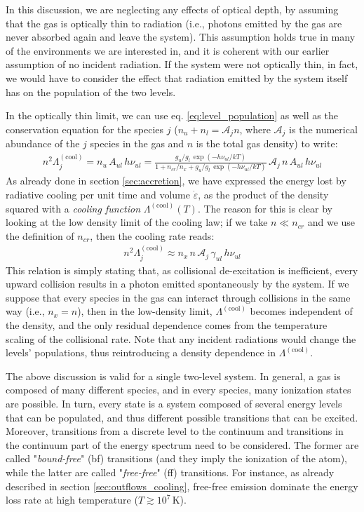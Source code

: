 In this discussion, we are neglecting any effects of optical depth, by assuming that the gas is optically thin to radiation (i.e., photons emitted by the gas are never absorbed again and leave the system). This assumption holds true in many of the environments we are interested in, and it is coherent with our earlier assumption of no incident radiation. If the system were not optically thin, in fact, we would have to consider the effect that radiation emitted by the system itself has on the population of the two levels. 

In the optically thin limit, we can use eq. \ref{eq:level_population} as well as the conservation equation for the species $j$ ($n_u + n_l = \mathcal{A}_j n$, where $\mathcal{A}_j$ is the numerical abundance of the $j$ species in the gas and $n$ is the total gas density) to write:
\begin{align}
    n^2 \Lambda_j^{\mathrm{(cool)}} = n_u\,A_{ul}\,h\nu_{ul} = \frac{g_u/g_l\, \exp(-h\nu_{ul}/kT)}{1+n_{cr}/n_x+ g_u/g_l\, \exp(-h\nu_{ul}/kT)}\,\mathcal{A}_j\,n\,A_{ul}\,h\nu_{ul}
\end{align}
As already done in section \ref{sec:accretion}, we have expressed the energy lost by radiative cooling per unit time and volume $\dot{\varepsilon}$, as the product of the density squared with a \textit{cooling function} $\Lambda^{\mathrm{(cool)}}(T)$. The reason for this is clear by looking at the low density limit of the cooling law; if we take $n\ll n_{cr}$ and we use the definition of $n_{cr}$, then the cooling rate reads:
\begin{align}
    n^2 \Lambda_j^{\mathrm{(cool)}} \approx n_x \,n\, \mathcal{A}_j\,\gamma_{ul}\, h\nu_{ul}
\end{align}
This relation is simply stating that, as collisional de-excitation is inefficient, every upward collision results in a photon emitted spontaneously by the system. If we suppose that every species in the gas can interact through collisions in the same way (i.e., $n_x=n$), then in the low-density limit, $\Lambda^{\mathrm{(cool)}}$ becomes independent of the density, and the only residual dependence comes from the temperature scaling of the collisional rate. Note that any incident radiations would change the levels' populations, thus reintroducing a density dependence in $\Lambda^\mathrm{(cool)}$.

The above discussion is valid for a single two-level system. In general, a gas is composed of many different species, and in every species, many ionization states are possible. In turn, every state is a system composed of several energy levels that can be populated, and thus different possible transitions that can be excited. Moreover, transitions from a discrete level to the continuum and transitions in the continuum part of the energy spectrum need to be considered. The former are called "\textit{bound-free}" (bf) transitions (and they imply the ionization of the atom), while the latter are called "\textit{free-free}" (ff) transitions. For instance, as already described in section \ref{sec:outflows_cooling}, free-free emission dominate the energy loss rate at high temperature ($T\gtrsim 10^7\,\mathrm{K}$). 

